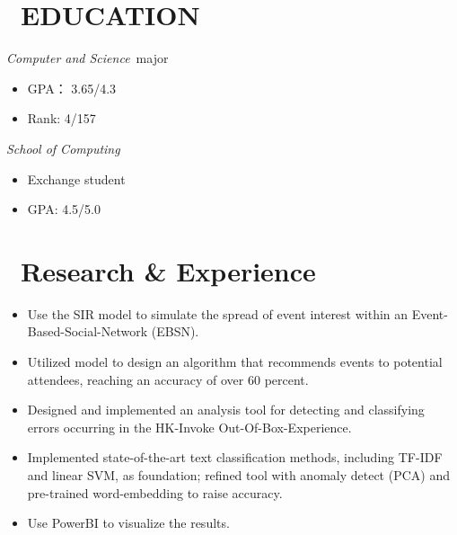 \documentclass{resume}
\begin{document}
\pagestyle{plain}
 
 
\section{\faGraduationCap\ EDUCATION}
\textit{Computer and Science}\ major
\begin{itemize}
  \item GPA： 3.65/4.3
  \item Rank: 4/157
\end{itemize}
\textit{School of Computing}
\begin{itemize}
  \item Exchange student
  \item GPA: 4.5/5.0
\end{itemize}

\section{\faUsers\ Research \& Experience }
\begin{itemize}
  \item Use the SIR model to simulate the spread of event interest within an Event-Based-Social-Network (EBSN).
  \item Utilized model to design an algorithm that recommends events to potential attendees, reaching an accuracy of over 60 percent.
\end{itemize}

\begin{itemize}
  \item Designed and implemented an analysis tool for detecting and classifying errors occurring in the HK-Invoke Out-Of-Box-Experience.
  \item Implemented state-of-the-art text classification methods, including TF-IDF and linear SVM, as foundation; refined tool with anomaly detect (PCA) and pre-trained word-embedding to raise accuracy.
  \item Use PowerBI to visualize the results.
\end{itemize}
\end{document}
